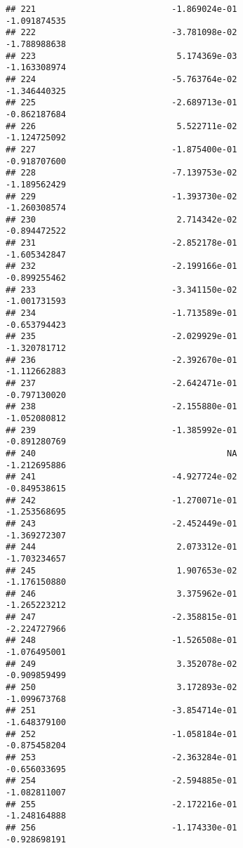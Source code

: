 \documentclass[
]{article}
\begin{document}
\begin{verbatim}
## 221                           -1.869024e-01               -1.091874535
## 222                           -3.781098e-02               -1.788988638
## 223                            5.174369e-03               -1.163308974
## 224                           -5.763764e-02               -1.346440325
## 225                           -2.689713e-01               -0.862187684
## 226                            5.522711e-02               -1.124725092
## 227                           -1.875400e-01               -0.918707600
## 228                           -7.139753e-02               -1.189562429
## 229                           -1.393730e-02               -1.260308574
## 230                            2.714342e-02               -0.894472522
## 231                           -2.852178e-01               -1.605342847
## 232                           -2.199166e-01               -0.899255462
## 233                           -3.341150e-02               -1.001731593
## 234                           -1.713589e-01               -0.653794423
## 235                           -2.029929e-01               -1.320781712
## 236                           -2.392670e-01               -1.112662883
## 237                           -2.642471e-01               -0.797130020
## 238                           -2.155880e-01               -1.052080812
## 239                           -1.385992e-01               -0.891280769
## 240                                      NA               -1.212695886
## 241                           -4.927724e-02               -0.849538615
## 242                           -1.270071e-01               -1.253568695
## 243                           -2.452449e-01               -1.369272307
## 244                            2.073312e-01               -1.703234657
## 245                            1.907653e-02               -1.176150880
## 246                            3.375962e-01               -1.265223212
## 247                           -2.358815e-01               -2.224727966
## 248                           -1.526508e-01               -1.076495001
## 249                            3.352078e-02               -0.909859499
## 250                            3.172893e-02               -1.099673768
## 251                           -3.854714e-01               -1.648379100
## 252                           -1.058184e-01               -0.875458204
## 253                           -2.363284e-01               -0.656033695
## 254                           -2.594885e-01               -1.082811007
## 255                           -2.172216e-01               -1.248164888
## 256                           -1.174330e-01               -0.928698191

\end{verbatim}
\end{document}
